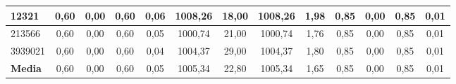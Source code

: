 \documentclass[12pt, spanish]{article}
\begin{document}
\begin{table}[H]
\begin{adjustwidth}{-1cm}{-1cm}
\begin{tabular}{|l|c|c|c|c|c|c|c|c|c|c|c|c|}
12321                                                   & 0,60                         & 0,00                           & 0,60                      & 0,06                   & 1008,26                      & 18,00                          & 1008,26                   & 1,98                   & 0,85                         & 0,00                           & 0,85                      & 0,01                   \\ \hline
213566                                                  & 0,60                         & 0,00                           & 0,60                      & 0,05                   & 1000,74                      & 21,00                          & 1000,74                   & 1,76                   & 0,85                         & 0,00                           & 0,85                      & 0,01                   \\ \hline
3939021                                                 & 0,60                         & 0,00                           & 0,60                      & 0,04                   & 1004,37                      & 29,00                          & 1004,37                   & 1,80                   & 0,85                         & 0,00                           & 0,85                      & 0,01                   \\ \hline
\textbf{Media}                                          & 0,60                         & 0,00                           & 0,60                      & 0,05                   & 1005,34                      & 22,80                          & 1005,34                   & 1,65                   & 0,85                         & 0,00                           & 0,85                      & 0,01                   \\ \hline
\end{tabular}

\end{adjustwidth}

\end{table}
\end{document}
